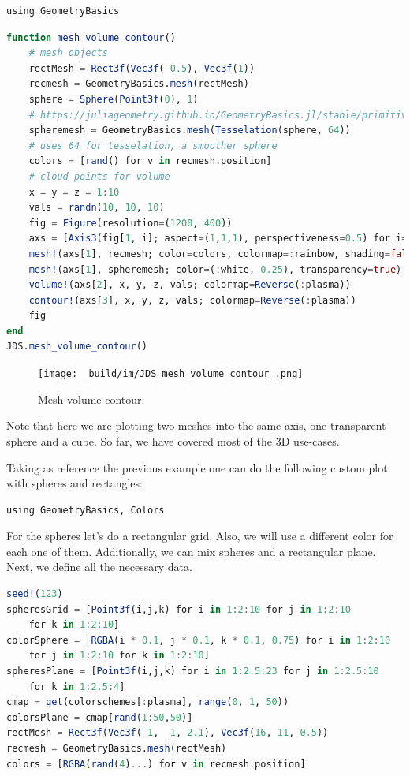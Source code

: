 \documentclass[
  notoc %
]{tufte-book}
\begin{document}
\begin{lstlisting}
using GeometryBasics
\end{lstlisting}

\begin{lstlisting}[language=Julia]
function mesh_volume_contour()
    # mesh objects
    rectMesh = Rect3f(Vec3f(-0.5), Vec3f(1))
    recmesh = GeometryBasics.mesh(rectMesh)
    sphere = Sphere(Point3f(0), 1)
    # https://juliageometry.github.io/GeometryBasics.jl/stable/primitives/
    spheremesh = GeometryBasics.mesh(Tesselation(sphere, 64))
    # uses 64 for tesselation, a smoother sphere
    colors = [rand() for v in recmesh.position]
    # cloud points for volume
    x = y = z = 1:10
    vals = randn(10, 10, 10)
    fig = Figure(resolution=(1200, 400))
    axs = [Axis3(fig[1, i]; aspect=(1,1,1), perspectiveness=0.5) for i=1:3]
    mesh!(axs[1], recmesh; color=colors, colormap=:rainbow, shading=false)
    mesh!(axs[1], spheremesh; color=(:white, 0.25), transparency=true)
    volume!(axs[2], x, y, z, vals; colormap=Reverse(:plasma))
    contour!(axs[3], x, y, z, vals; colormap=Reverse(:plasma))
    fig
end
JDS.mesh_volume_contour()
\end{lstlisting}

\begin{figure}
\hypertarget{fig:mesh_volume_contour}{%
\centering
\texttt{[image: \_build/im/JDS\_mesh\_volume\_contour\_.png]}
\caption{Mesh volume contour.}\label{fig:mesh_volume_contour}
}
\end{figure}

Note that here we are plotting two meshes into the same axis, one
transparent sphere and a cube. So far, we have covered most of the 3D
use-cases.

Taking as reference the previous example one can do the following custom
plot with spheres and rectangles:

\begin{lstlisting}
using GeometryBasics, Colors
\end{lstlisting}

For the spheres let's do a rectangular grid. Also, we will use a
different color for each one of them. Additionally, we can mix spheres
and a rectangular plane. Next, we define all the necessary data.

\begin{lstlisting}[language=Julia]
seed!(123)
spheresGrid = [Point3f(i,j,k) for i in 1:2:10 for j in 1:2:10
    for k in 1:2:10]
colorSphere = [RGBA(i * 0.1, j * 0.1, k * 0.1, 0.75) for i in 1:2:10
    for j in 1:2:10 for k in 1:2:10]
spheresPlane = [Point3f(i,j,k) for i in 1:2.5:23 for j in 1:2.5:10
    for k in 1:2.5:4]
cmap = get(colorschemes[:plasma], range(0, 1, 50))
colorsPlane = cmap[rand(1:50,50)]
rectMesh = Rect3f(Vec3f(-1, -1, 2.1), Vec3f(16, 11, 0.5))
recmesh = GeometryBasics.mesh(rectMesh)
colors = [RGBA(rand(4)...) for v in recmesh.position]
\end{lstlisting}
\end{document}
